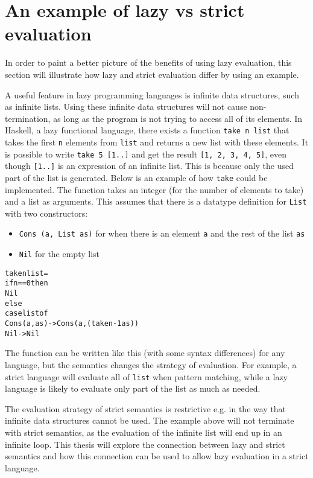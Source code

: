 \section{An example of lazy vs strict evaluation}
\label{intro:Example}
In order to paint a better picture of the benefits of using lazy evaluation,
this section will illustrate how lazy and strict evaluation differ by using
an example.

A useful feature in lazy programming languages is
infinite data structures, such as infinite lists. Using
these infinite data structures will not cause non-termination, as long as the
program is not trying to access all of its elements. In Haskell, a lazy
functional language, there exists a function \texttt{take n list} that takes the
first \texttt{n} elements from \texttt{list} and returns a new list with
these elements. It is possible to write \texttt{take 5 [1..]} and get the
result \texttt{[1, 2, 3, 4, 5]}, even though \texttt{[1..]} is
an expression of an infinite list. This is because only the used part of the
list is generated.
Below is an example of how \texttt{take} could be implemented. The function
takes an integer (for the number of elements to take) and a list as arguments.
This assumes that there is a datatype definition for \texttt{List} with two
constructors:
\begin{itemize}
  \item \texttt{Cons (a, List as)} for when there is an element \texttt{a} and the rest of the list \texttt{as}
  \item \texttt{Nil} for the empty list
\end{itemize}

\begin{alltt}
  take n list =
    if n == 0 then
      Nil
    else
      case list of
        Cons (a, as) -> Cons (a, (take n-1 as))
        Nil          -> Nil
\end{alltt}

\noindent The function can be written like this (with some syntax differences)
for any language, but the semantics
changes the strategy of evaluation. For example, a strict language will evaluate
all of \texttt{list} when pattern matching, while a lazy language is likely to
evaluate only part of the list as much as needed. 

The evaluation strategy of strict semantics is restrictive e.g. in the way that
infinite data structures cannot be used. The example above will not terminate
with strict semantics, as the evaluation of the infinite list will end up in an
infinite loop. This thesis will explore the connection between lazy and strict
semantics and how this connection can be used to allow lazy evaluation in a
strict language.

